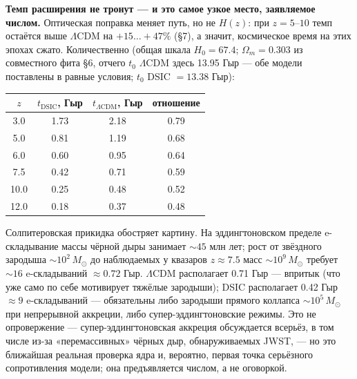 \documentclass{article}
\begin{document}
\medskip
\noindent\textbf{Темп расширения не тронут --- и это самое узкое место, заявляемое числом.} Оптическая поправка меняет путь, но не $H(z)$: при $z = 5\text{--}10$ темп остаётся выше $\Lambda$CDM на $+15\ldots+47\%$ (\S7), а значит, космическое время на этих эпохах сжато. Количественно (общая шкала $H_0 = 67.4$; $\Omega_m = 0.303$ из совместного фита \S6, отчего $t_0$ $\Lambda$CDM здесь 13.95 Гыр --- обе модели поставлены в равные условия; $t_0$ DSIC $= 13.38$ Гыр):

\begin{table}[htbp]
\centering
\small
\begin{tabular}{@{}cccc@{}}
\toprule
$z$ & $t_{\text{DSIC}}$, Гыр & $t_{\Lambda\text{CDM}}$, Гыр & отношение \\
\midrule
3.0 & 1.73 & 2.18 & 0.79 \\
5.0 & 0.81 & 1.19 & 0.68 \\
6.0 & 0.60 & 0.95 & 0.64 \\
7.5 & 0.42 & 0.71 & 0.59 \\
10.0 & 0.25 & 0.48 & 0.52 \\
12.0 & 0.18 & 0.37 & 0.48 \\
\bottomrule
\end{tabular}
\end{table}

Солпитеровская прикидка обостряет картину. На эддингтоновском пределе e-складывание массы чёрной дыры занимает ${\sim}45$ млн лет; рост от звёздного зародыша ${\sim}10^2\,M_\odot$ до наблюдаемых у квазаров $z \approx 7.5$ масс ${\sim}10^9\,M_\odot$ требует ${\sim}16$ e-складываний $\approx 0.72$ Гыр. $\Lambda$CDM располагает 0.71 Гыр --- впритык (что уже само по себе мотивирует тяжёлые зародыши); DSIC располагает 0.42 Гыр $\approx 9$ e-складываний --- обязательны либо зародыши прямого коллапса ${\sim}10^5\,M_\odot$ при непрерывной аккреции, либо супер-эддингтоновские режимы. Это не опровержение --- супер-эддингтоновская аккреция обсуждается всерьёз, в том числе из-за «перемассивных» чёрных дыр, обнаруживаемых JWST, --- но это ближайшая реальная проверка ядра и, вероятно, первая точка серьёзного сопротивления модели; она предъявляется числом, а не оговоркой.
\end{document}

